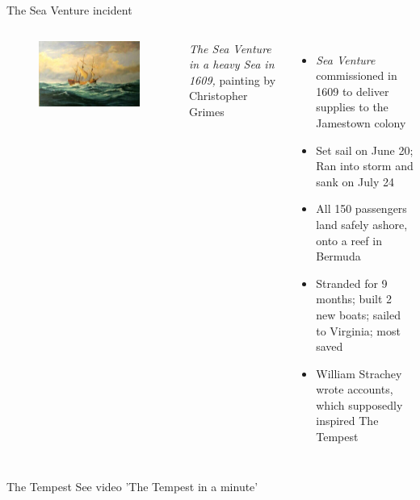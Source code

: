 \documentclass{beamer}
\begin{document}
\begin{frame}{The Sea Venture incident}
  \begin{columns}[c]
    \begin{figure}[htp]
      \begin{center}
        \centering
        \includegraphics[scale=0.29]{seaventure.jpg}
      \end{center}
    \end{figure}
    \footnotesize{\emph{The Sea Venture in a heavy Sea in 1609,} painting by Christopher Grimes}

  \begin{itemize}
  \item \emph{Sea Venture} commissioned in 1609 to deliver supplies to the Jamestown colony
  \item Set sail on June 20; Ran into storm and sank on July 24
  \item All 150 passengers land safely ashore, onto a reef in Bermuda
  \item Stranded for 9 months; built 2 new boats; sailed to Virginia; most saved
  \item William Strachey wrote accounts, which supposedly inspired The Tempest
  \end{itemize}
  \end{columns}
\end{frame}


\begin{frame}{The Tempest}
  See video 'The Tempest in a minute'
\end{frame}
\end{document}
